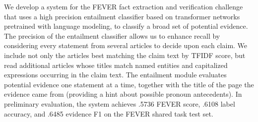 We develop a system for the FEVER fact extraction and verification challenge that uses a high precision entailment classifier based on transformer networks pretrained with language modeling, to classify a broad set of potential evidence.  The precision of the entailment classifier allows us to enhance recall by considering every statement from several articles to decide upon each claim.  We include not only the articles best matching the claim text by TFIDF score, but read additional articles whose titles match named entities and capitalized expressions occurring in the claim text.  The entailment module evaluates potential evidence one statement at a time, together with the title of the page the evidence came from (providing a hint about possible pronoun antecedents).  In preliminary evaluation, the system achieves .5736 FEVER score, .6108 label accuracy, and .6485 evidence F1 on the FEVER shared task test set.

